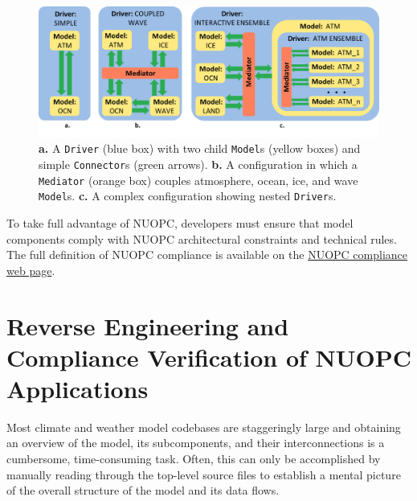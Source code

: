 \documentclass[oneside,11pt]{memoir}
\begin{document}
\begin{figure}
	\centering
	 \includegraphics[width=\textwidth]{figs/nuopcarchs.png}
	\caption{\textbf{a.} A \texttt{Driver} (blue box) with two child \texttt{Model}s (yellow boxes) and simple \texttt{Connector}s (green arrows).  \textbf{b.} A configuration in which a \texttt{Mediator} (orange box) couples atmosphere, ocean, ice, and wave \texttt{Model}s.  \textbf{c.} A complex configuration showing nested \texttt{Driver}s.}
	\label{fig:nuopcarchs}
\end{figure}

To take full advantage of NUOPC, developers must ensure that model components comply with NUOPC architectural constraints and technical rules. The full definition of NUOPC compliance is available on the \href{http://earthsystemcog.org/projects/nuopc/esmf2nuopc}{NUOPC compliance web page}. 


\chapter{Reverse Engineering and Compliance Verification of NUOPC Applications}

Most climate and weather model codebases are staggeringly large and obtaining an overview of the model, its subcomponents, and their interconnections is a cumbersome, time-consuming task. Often, this can only be accomplished by manually reading through the top-level source files to establish a mental picture of the overall structure of the model and its data flows. 
\end{document}
